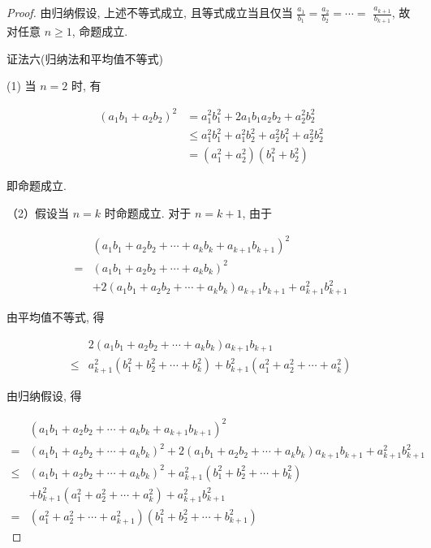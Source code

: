 \begin{proof}
	由归纳假设, 上述不等式成立, 且等式成立当且仅当 $\frac{a_{1}}{b_{1}}=\frac{a_{2}}{b_{2}}=\cdots=$ $\frac{a_{k+1}}{b_{k+1}}$, 故对任意 $n \geqslant 1$, 命题成立.
	
	证法六(归纳法和平均值不等式)
	
	(1) 当 $n=2$ 时, 有
	
	$$
	\begin{aligned}
	\left(a_{1} b_{1}+a_{2} b_{2}\right)^{2} & =a_{1}^{2} b_{1}^{2}+2 a_{1} b_{1} a_{2} b_{2}+a_{2}^{2} b_{2}^{2} \\
	& \leqslant a_{1}^{2} b_{1}^{2}+a_{1}^{2} b_{2}^{2}+a_{2}^{2} b_{1}^{2}+a_{2}^{2} b_{2}^{2} \\
	& =\left(a_{1}^{2}+a_{2}^{2}\right)\left(b_{1}^{2}+b_{2}^{2}\right)
	\end{aligned}
	$$
	
	即命题成立.
	
	（2）假设当 $n=k$ 时命题成立. 对于 $n=k+1$, 由于
	
	$$
	\begin{aligned}
	& \left(a_{1} b_{1}+a_{2} b_{2}+\cdots+a_{k} b_{k}+a_{k+1} b_{k+1}\right)^{2} \\
	= & \left(a_{1} b_{1}+a_{2} b_{2}+\cdots+a_{k} b_{k}\right)^{2} \\
	& +2\left(a_{1} b_{1}+a_{2} b_{2}+\cdots+a_{k} b_{k}\right) a_{k+1} b_{k+1}+a_{k+1}^{2} b_{k+1}^{2}
	\end{aligned}
	$$
	
	由平均值不等式, 得
	
	$$
	\begin{aligned}
	& 2\left(a_{1} b_{1}+a_{2} b_{2}+\cdots+a_{k} b_{k}\right) a_{k+1} b_{k+1} \\
	\leqslant & a_{k+1}^{2}\left(b_{1}^{2}+b_{2}^{2}+\cdots+b_{k}^{2}\right)+b_{k+1}^{2}\left(a_{1}^{2}+a_{2}^{2}+\cdots+a_{k}^{2}\right)
	\end{aligned}
	$$
	
	由归纳假设, 得
	
	$$
	\begin{aligned}
	& \left(a_{1} b_{1}+a_{2} b_{2}+\cdots+a_{k} b_{k}+a_{k+1} b_{k+1}\right)^{2} \\
	= & \left(a_{1} b_{1}+a_{2} b_{2}+\cdots+a_{k} b_{k}\right)^{2}+2\left(a_{1} b_{1}+a_{2} b_{2}+\cdots+a_{k} b_{k}\right) a_{k+1} b_{k+1}+a_{k+1}^{2} b_{k+1}^{2} \\
	\leqslant & \left(a_{1} b_{1}+a_{2} b_{2}+\cdots+a_{k} b_{k}\right)^{2}+a_{k+1}^{2}\left(b_{1}^{2}+b_{2}^{2}+\cdots+b_{k}^{2}\right) \\
	& +b_{k+1}^{2}\left(a_{1}^{2}+a_{2}^{2}+\cdots+a_{k}^{2}\right)+a_{k+1}^{2} b_{k+1}^{2} \\
	= & \left(a_{1}^{2}+a_{2}^{2}+\cdots+a_{k+1}^{2}\right)\left(b_{1}^{2}+b_{2}^{2}+\cdots+b_{k+1}^{2}\right)
	\end{aligned}
	$$
	

\end{proof}
